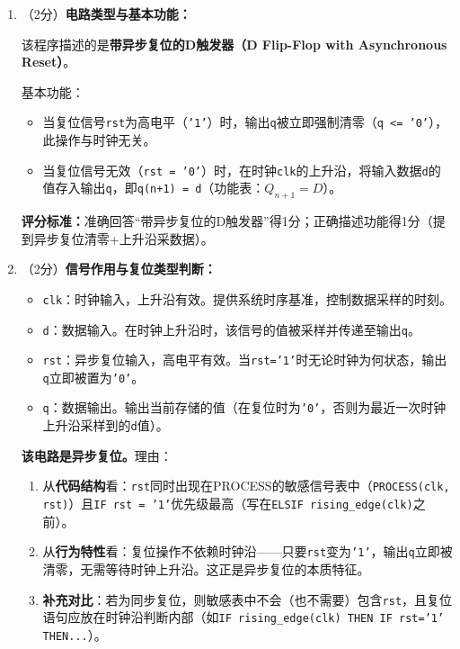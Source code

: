 \begin{enumerate}[label=(\arabic*), leftmargin=*]

\item （2分）\textbf{电路类型与基本功能：}

该程序描述的是\textbf{带异步复位的D触发器（D Flip-Flop with Asynchronous Reset）}。

基本功能：
\begin{itemize}
  \item 当复位信号\texttt{rst}为高电平（\texttt{'1'}）时，输出\texttt{q}被立即强制清零（\texttt{q <= '0'}），此操作与时钟无关。
  \item 当复位信号无效（\texttt{rst = '0'}）时，在时钟\texttt{clk}的上升沿，将输入数据\texttt{d}的值存入输出\texttt{q}，即\texttt{q(n+1) = d}（功能表：$Q_{n+1}=D$）。
\end{itemize}

\medskip
\noindent\textbf{评分标准：}准确回答“带异步复位的D触发器”得1分；正确描述功能得1分（提到异步复位清零+上升沿采数据）。


\item （2分）\textbf{信号作用与复位类型判断：}

\begin{itemize}
  \item \texttt{clk}：时钟输入，上升沿有效。提供系统时序基准，控制数据采样的时刻。
  \item \texttt{d}：数据输入。在时钟上升沿时，该信号的值被采样并传递至输出\texttt{q}。
  \item \texttt{rst}：异步复位输入，高电平有效。当\texttt{rst='1'}时无论时钟为何状态，输出\texttt{q}立即被置为\texttt{'0'}。
  \item \texttt{q}：数据输出。输出当前存储的值（在复位时为\texttt{'0'}，否则为最近一次时钟上升沿采样到的\texttt{d}值）。
\end{itemize}

\noindent\textbf{该电路是异步复位。}理由：
\begin{enumerate}
  \item 从\textbf{代码结构}看：\texttt{rst}同时出现在PROCESS的敏感信号表中（\texttt{PROCESS(clk, rst)}）且\texttt{IF rst = '1'}优先级最高（写在\texttt{ELSIF rising\_edge(clk)}之前）。
  \item 从\textbf{行为特性}看：复位操作不依赖时钟沿——只要\texttt{rst}变为\texttt{'1'}，输出\texttt{q}立即被清零，无需等待时钟上升沿。这正是异步复位的本质特征。
  \item \textbf{补充对比}：若为同步复位，则敏感表中不会（也不需要）包含\texttt{rst}，且复位语句应放在时钟沿判断内部（如\texttt{IF rising\_edge(clk) THEN IF rst='1' THEN...}）。
\end{enumerate}


\end{enumerate}

